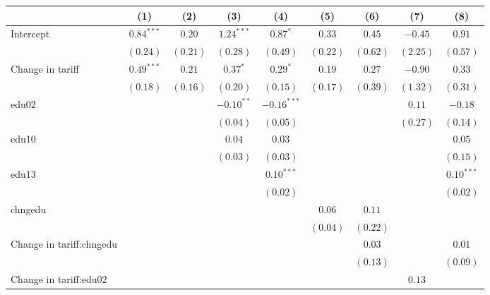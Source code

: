 
\begin{tabular}{l c c c c c c c c }
\hline
 & (1) & (2) & (3) & (4) & (5) & (6) & (7) & (8) \\
\hline
Intercept     & $0.84^{***}$ & $0.20$   & $1.24^{***}$ & $0.87^{*}$    & $0.33$   & $0.45$   & $-0.45$  & $0.91$       \\
                & $(0.24)$     & $(0.21)$ & $(0.28)$     & $(0.49)$      & $(0.22)$ & $(0.62)$ & $(2.25)$ & $(0.57)$     \\
Change in tariff         & $0.49^{***}$ & $0.21$   & $0.37^{*}$   & $0.29^{*}$    & $0.19$   & $0.27$   & $-0.90$  & $0.33$       \\
                & $(0.18)$     & $(0.16)$ & $(0.20)$     & $(0.15)$      & $(0.17)$ & $(0.39)$ & $(1.32)$ & $(0.31)$     \\
edu02           &              &          & $-0.10^{**}$ & $-0.16^{***}$ &          &          & $0.11$   & $-0.18$      \\
                &              &          & $(0.04)$     & $(0.05)$      &          &          & $(0.27)$ & $(0.14)$     \\
edu10           &              &          & $0.04$       & $0.03$        &          &          &          & $0.05$       \\
                &              &          & $(0.03)$     & $(0.03)$      &          &          &          & $(0.15)$     \\
edu13           &              &          &              & $0.10^{***}$  &          &          &          & $0.10^{***}$ \\
                &              &          &              & $(0.02)$      &          &          &          & $(0.02)$     \\
chngedu         &              &          &              &               & $0.06$   & $0.11$   &          &              \\
                &              &          &              &               & $(0.04)$ & $(0.22)$ &          &              \\
Change in tariff:chngedu &              &          &              &               &          & $0.03$   &          & $0.01$       \\
                &              &          &              &               &          & $(0.13)$ &          & $(0.09)$     \\
Change in tariff:edu02   &              &          &              &               &          &          & $0.13$   &              \\

\end{tabular}
